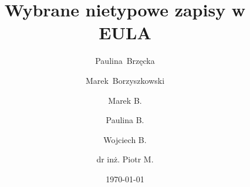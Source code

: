 \documentclass[polish,aspectratio=169]{beamer}
\title[Wybrane nietypowe zapisy w EULA]{Wybrane nietypowe zapisy w EULA}
\subtitle{}
\author{Paulina~Brzęcka \and Marek~Borzyszkowski}
\date{\today}
\begin{document}
        
\author{Marek B. \and Paulina B. \and Wojciech B. \and dr inż. Piotr M. }



% 


\end{document}
